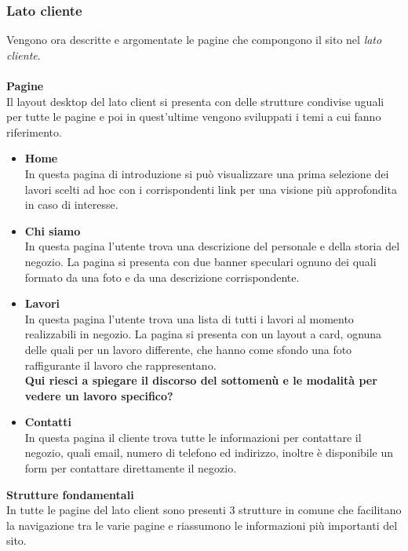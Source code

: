 \subsubsection{Lato cliente}
Vengono ora descritte e argomentate le pagine che compongono il sito nel \textit{lato cliente}.\\\\
\textbf{Pagine}\\
Il layout desktop del lato client si presenta con delle strutture condivise uguali per tutte le pagine e poi in quest'ultime vengono sviluppati i temi a cui fanno riferimento.
	\begin{itemize}
		\item \textbf{Home} \\In questa pagina di introduzione si può visualizzare una prima selezione dei lavori scelti ad hoc con i corrispondenti link per una visione più approfondita in caso di interesse.
		\item \textbf{Chi siamo}\\In questa pagina l'utente trova una descrizione del personale e della storia del negozio. La pagina si presenta con due banner speculari ognuno dei quali formato da una foto e da una descrizione corrispondente.
		\item \textbf{Lavori}\\In questa pagina l'utente trova una lista di tutti i lavori al momento realizzabili in negozio. La pagina si presenta con un layout a card, ognuna delle quali per un lavoro differente, che hanno come sfondo una foto raffigurante il lavoro che rappresentano.\\\textbf{Qui riesci a spiegare il discorso del sottomenù e le modalità per vedere un lavoro specifico?}
	 	\item \textbf{Contatti}\\In questa pagina il cliente trova tutte le informazioni per contattare il negozio, quali email, numero di telefono ed indirizzo, inoltre è disponibile un form per contattare direttamente il negozio.
 	\end{itemize}
\textbf{Strutture fondamentali}\\ 
In tutte le pagine del lato client sono presenti 3 strutture in comune che facilitano la navigazione tra le varie pagine e riassumono le informazioni più importanti del sito.
